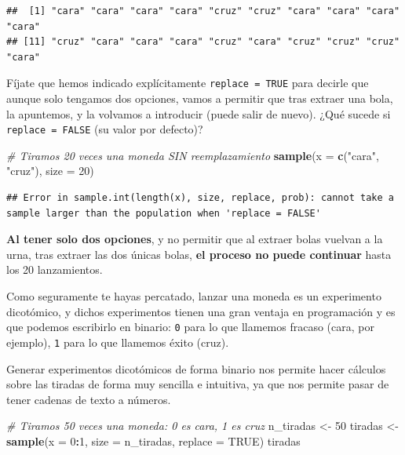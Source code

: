 \documentclass[11pt,]{book}
\newenvironment{Shaded}{\begin{snugshade}}{\end{snugshade}}
\newcommand{\CommentTok}[1]{\textcolor[rgb]{0.37,0.37,0.37}{\textit{#1}}}
\newcommand{\DataTypeTok}[1]{\textcolor[rgb]{0.27,0.27,0.27}{#1}}
\newcommand{\DecValTok}[1]{\textcolor[rgb]{0.06,0.06,0.06}{#1}}
\newcommand{\KeywordTok}[1]{\textcolor[rgb]{0.27,0.27,0.27}{\textbf{#1}}}
\newcommand{\NormalTok}[1]{#1}
\newcommand{\OperatorTok}[1]{\textcolor[rgb]{0.43,0.43,0.43}{\textbf{#1}}}
\newcommand{\OtherTok}[1]{\textcolor[rgb]{0.37,0.37,0.37}{#1}}
\newcommand{\StringTok}[1]{\textcolor[rgb]{0.5,0.5,0.5}{#1}}
\begin{document}
\begin{verbatim}
##  [1] "cara" "cara" "cara" "cara" "cruz" "cruz" "cara" "cara" "cara" "cara"
## [11] "cruz" "cara" "cara" "cara" "cruz" "cara" "cruz" "cruz" "cruz" "cara"
\end{verbatim}

Fíjate que hemos indicado explícitamente \texttt{replace\ =\ TRUE} para decirle que aunque solo tengamos dos opciones, vamos a permitir que tras extraer una bola, la apuntemos, y la volvamos a introducir (puede salir de nuevo). ¿Qué sucede si \texttt{replace\ =\ FALSE} (su valor por defecto)?

\begin{Shaded}
\begin{Highlighting}[]
\CommentTok{# Tiramos 20 veces una moneda SIN reemplazamiento}
\KeywordTok{sample}\NormalTok{(}\DataTypeTok{x =} \KeywordTok{c}\NormalTok{(}\StringTok{"cara"}\NormalTok{, }\StringTok{"cruz"}\NormalTok{), }\DataTypeTok{size =} \DecValTok{20}\NormalTok{)}
\end{Highlighting}
\end{Shaded}

\begin{verbatim}
## Error in sample.int(length(x), size, replace, prob): cannot take a sample larger than the population when 'replace = FALSE'
\end{verbatim}

\textbf{Al tener solo dos opciones}, y no permitir que al extraer bolas vuelvan a la urna, tras extraer las dos únicas bolas, \textbf{el proceso no puede continuar} hasta los 20 lanzamientos.

Como seguramente te hayas percatado, lanzar una moneda es un experimento dicotómico, y dichos experimentos tienen una gran ventaja en programación y es que podemos escribirlo en binario: \texttt{0} para lo que llamemos fracaso (cara, por ejemplo), \texttt{1} para lo que llamemos éxito (cruz).

Generar experimentos dicotómicos de forma binario nos permite hacer cálculos sobre las tiradas de forma muy sencilla e intuitiva, ya que nos permite pasar de tener cadenas de texto a números.

\begin{Shaded}
\begin{Highlighting}[]
\CommentTok{# Tiramos 50 veces una moneda: 0 es cara, 1 es cruz}
\NormalTok{n_tiradas <-}\StringTok{ }\DecValTok{50}
\NormalTok{tiradas <-}\StringTok{ }\KeywordTok{sample}\NormalTok{(}\DataTypeTok{x =} \DecValTok{0}\OperatorTok{:}\DecValTok{1}\NormalTok{, }\DataTypeTok{size =}\NormalTok{ n_tiradas, }\DataTypeTok{replace =} \OtherTok{TRUE}\NormalTok{)}
\NormalTok{tiradas}
\end{Highlighting}
\end{Shaded}
\end{document}
